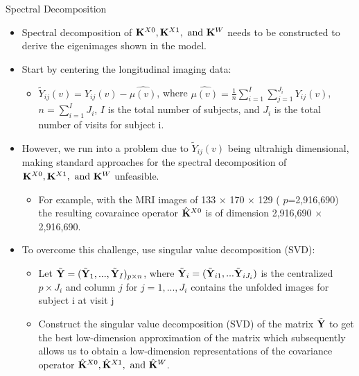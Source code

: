 \documentclass[
  ignorenonframetext,
]{beamer}
\providecommand{\tightlist}{%
  \setlength{\itemsep}{0pt}\setlength{\parskip}{0pt}}
\begin{document}
\begin{frame}{Spectral Decomposition}
\protect\hypertarget{spectral-decomposition}{}
\begin{itemize}
\item
  Spectral decomposition of
  \(\mathrm{\bf{K}}^{X0}, \mathrm{\bf{K}}^{X1}, \text{ and } \mathrm{\bf{K}}^{W}\)
  needs to be constructed to derive the eigenimages shown in the model.
\item
  Start by centering the longitudinal imaging data:

  \begin{itemize}
  \tightlist
  \item
    \(\tilde{Y}_{ij}(v) = Y_{ij}(v) - \hat{\mu(v)}\), where
    \(\hat{\mu(v)} = \frac{1}{n} \sum^I_{i=1} \sum^{J_i}_{j=1}Y_{ij}(v)\),
    \(n = \sum^I_{i=1}J_i\), \(I\) is the total number of subjects, and
    \(J_i\) is the total number of visits for subject i.
  \end{itemize}
\item
  However, we run into a problem due to \(\tilde{Y}_{ij}(v)\) being
  ultrahigh dimensional, making standard approaches for the spectral
  decomposition of
  \(\mathrm{\bf{K}}^{X0}, \mathrm{\bf{K}}^{X1}, \text{ and } \mathrm{\bf{K}}^{W}\)
  unfeasible.

  \begin{itemize}
  \tightlist
  \item
    For example, with the MRI images of 133 × 170 × 129 (
    \(p\)=2,916,690) the resulting covaraince operator
    \(\hat{\mathrm{\bf{K}}}^{X0}\) is of dimension 2,916,690 \(\times\)
    2,916,690.
  \end{itemize}
\item
  To overcome this challenge, use singular value decomposition (SVD):

  \begin{itemize}
  \tightlist
  \item
    Let
    \(\tilde{\mathrm{\bf{Y}}} = (\tilde{\mathrm{\bf{Y}}}_1, ..., \tilde{\mathrm{\bf{Y}}}_I)_{p \times n}\),
    where
    \(\tilde{\mathrm{\bf{Y}}}_i = (\tilde{\mathrm{\bf{Y}}}_{i1},...\tilde{\mathrm{\bf{Y}}}_{iJ_i})\)
    is the centralized \(p \times J_i\) and column \(j\) for
    \(j = 1,...,J_i\) contains the unfolded images for subject i at
    visit j
  \item
    Construct the singular value decomposition (SVD) of the matrix
    \(\tilde{\mathrm{\bf{Y}}}\) to get the best low-dimension
    approximation of the matrix which subsequently allows us to obtain a
    low-dimension representations of the covariance operator
    \(\hat{\mathrm{\bf{K}}}^{X0}, \hat{\mathrm{\bf{K}}}^{X1}, \text{ and } \hat{\mathrm{\bf{K}}}^{W}\).
  \end{itemize}
\end{itemize}
\end{frame}
\end{document}
